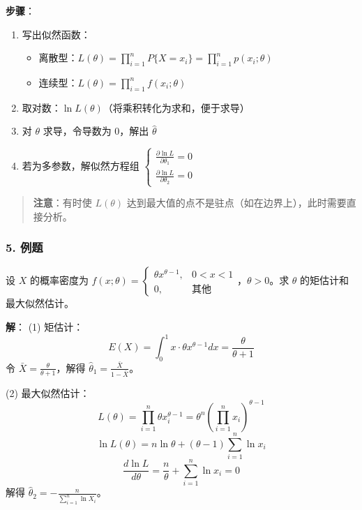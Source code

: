 \documentclass[12pt,a4paper]{ctexart}
\newenvironment{myquote}
  {\par\vspace{0.5em}\begin{quote}\sffamily\color{gray}}
  {\end{quote}\vspace{0.5em}}
\begin{document}
\textbf{步骤}：
\begin{enumerate}[noitemsep]
    \item 写出似然函数：
          \begin{itemize}[noitemsep]
              \item 离散型：$\displaystyle L(\theta) = \prod_{i=1}^n P\{X = x_i\} = \prod_{i=1}^n p(x_i; \theta)$
              \item 连续型：$\displaystyle L(\theta) = \prod_{i=1}^n f(x_i; \theta)$
          \end{itemize}
    \item 取对数：$\ln L(\theta)$（将乘积转化为求和，便于求导）
    \item 对 $\theta$ 求导，令导数为 0，解出 $\hat{\theta}$
    \item 若为多参数，解似然方程组 $\begin{cases} \frac{\partial \ln L}{\partial \theta_1} = 0 \\ \frac{\partial \ln L}{\partial \theta_2} = 0 \end{cases}$
\end{enumerate}

\begin{myquote}
    \textbf{注意}：有时使 $L(\theta)$ 达到最大值的点不是驻点（如在边界上），此时需要直接分析。
\end{myquote}

\subsubsection{5. 例题}
设 $X$ 的概率密度为 $f(x; \theta) = \begin{cases} \theta x^{\theta-1}, & 0 < x < 1 \\ 0, & \text{其他} \end{cases}$，$\theta > 0$。求 $\theta$ 的矩估计和最大似然估计。

\textbf{解}：
(1) 矩估计：
\[
    E(X) = \int_0^1 x \cdot \theta x^{\theta-1} dx = \frac{\theta}{\theta+1}
\]
令 $\bar{X} = \frac{\theta}{\theta+1}$，解得 $\hat{\theta}_1 = \frac{\bar{X}}{1-\bar{X}}$。

(2) 最大似然估计：
\[
    L(\theta) = \prod_{i=1}^n \theta x_i^{\theta-1} = \theta^n \left(\prod_{i=1}^n x_i\right)^{\theta-1}
\]
\[
    \ln L(\theta) = n \ln \theta + (\theta-1) \sum_{i=1}^n \ln x_i
\]
\[
    \frac{d \ln L}{d\theta} = \frac{n}{\theta} + \sum_{i=1}^n \ln x_i = 0
\]
解得 $\hat{\theta}_2 = -\frac{n}{\sum_{i=1}^n \ln X_i}$。

\end{document}
